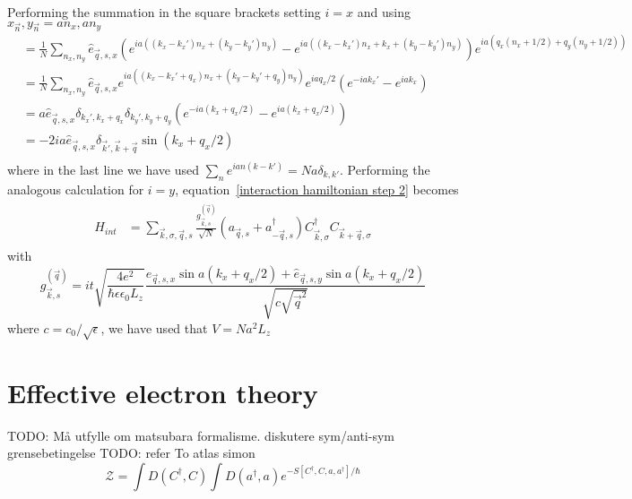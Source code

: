 \documentclass{article}
\begin{document}
Performing the summation in the square brackets setting $i = x$ and using $x_{\vec{n}},y_{\vec{n}} = a n_x, a n_y$
\begin{align*}
    [...] &= \frac{1}{N}\sum_{n_x, n_y} \hat{e}_{\vec{q},s,x} ( e^{i a\left((k_x - k_x') n_x + (k_y - k_y') n_y \right)} -  e^{i a\left((k_x - k_x') n_x + k_x + (k_y - k_y') n_y \right)}) e^{i a \left(q_x \left(n_x + 1/2\right) + q_y (n_y + 1/2)\right)}\\
          &= \frac{1}{N}\sum_{n_x, n_y} \hat{e}_{\vec{q},s,x} e^{i a\left((k_x - k_x' + q_x) n_x + (k_y - k_y' + q_y) n_y \right)} e^{ia q_x / 2} ( e^{- i a k_x' } -  e^{i a k_x })\\
          &= a \hat{e}_{\vec{q},s,x} \delta_{k_x',k_x + q_x} \delta_{k_y',k_y + q_y}  ( e^{- i a (k_x + q_x /2) } -  e^{i a (k_x + q_x/2)  })\\
          &=   -2 i a \hat{e}_{\vec{q},s,x} \delta_{\vec{k}',\vec{k} + \vec{q}} \sin(k_x + q_x /2)\\
\end{align*}
where in the last line we have used $\sum_n e^{ian(k - k')} = N a \delta_{k,k'}$. Performing the analogous calculation for $i = y$, equation~\cref{interaction hamiltonian step 2} becomes
\begin{align}
\begin{split}
    H_{int} &=  \sum_{\vec{k},\sigma,\vec{q},s} \frac{g_{\vec{k},s}^{(\vec{q})}}{\sqrt{N}} \left(a_{\vec{q},s} + a_{-\vec{q}, s}^{\dagger}\right) C_{\vec{k},\sigma}^{\dagger} C_{\vec{k} + \vec{q},\sigma} 
    \end{split}
\end{align}
with 
\begin{equation}
   g_{\vec{k},s}^{(\vec{q})} = i t \sqrt{\frac{4 e^2}{\hbar \epsilon \epsilon_0 L_z}} \frac{\hat{e}_{\vec{q},s,x} \sin{a(k_x + q_x /2)} + \hat{e}_{\vec{q},s,y} \sin{a(k_x + q_x /2)}}{\sqrt{c \sqrt{\vec{q}^2}}}
\end{equation}
where $c = c_0 / \sqrt{\epsilon}$, we have used that $V = N a^2 L_z$


\section{Effective electron theory}
TODO: Må utfylle om matsubara formalisme. diskutere sym/anti-sym grensebetingelse
TODO: refer To atlas simon
\begin{equation}
    \mathcal{Z} = \int D(C^{\dagger}, C) \int D(a^{\dagger}, a) e^{-S[C^{\dagger},C,a,a^{\dagger}] / \hbar}
    \label{path integral}
\end{equation}
\end{document}
